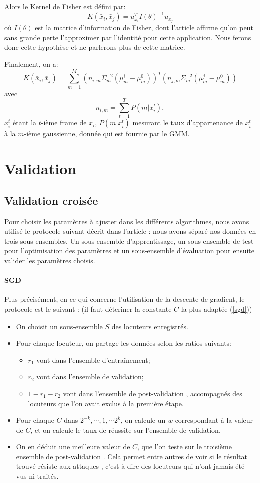 \documentclass{article}
\begin{document}
Alors le Kernel de Fisher est défini par:
\[K(\bar{x}_i,\bar{x}_j) = u_{\bar{x}_i}^{T} I(\theta)^{-1} u_{\bar{x}_j}\]
où $I(\theta)$ est la matrice d'information de Fisher, dont l'article affirme qu'on peut sans grande perte l'approximer par l'identité pour cette application. Nous ferons donc cette hypothèse et ne parlerons plus de cette matrice.


Finalement, on a:
\[ K(\bar{x}_i,\bar{x}_j) = \sum_{m=1}^M (n_{i,m} \Sigma_m^{-2} (\mu_m^i - \mu_m^0))^{T} (n_{j,m} \Sigma_m^{-2} (\mu_m^j - \mu_m^0)) \]
avec
\[n_{i,m} = \sum_{t=1}^{T} P(m | x_i^t),\]
$x_i^t$ étant la $t$-ième frame de $x_i$, $P(m | x_i^t)$ mesurant le taux d'appartenance de $x_i^t$ à la $m$-ième gaussienne, donnée qui est fournie par le GMM.


\section{Validation}
\label{validation}
\subsection{Validation croisée}
Pour choisir les paramètres à ajuster dans les différents algorithmes, nous avons utilisé le protocole suivant décrit dans l'article : nous avons séparé nos données en trois sous-ensembles. Un sous-ensemble d'apprentissage, un sous-ensemble de test pour l'optimisation des paramètres et un sous-ensemble d'évaluation pour ensuite valider les paramètres choisis.

\paragraph{SGD} Plus précisément, en ce qui concerne l'utilisation de la descente de gradient, le protocole est le suivant :
(il faut déteriner la constante $C$ la plus adaptée (\ref{sgd}))
\begin{itemize}
\item On choisit un sous-ensemble $S$ des locuteurs enregistrés.
\item Pour chaque locuteur, on partage les données selon les ratios suivants:
\begin{itemize}
\item $r_1$ vont dans l'ensemble d'entraînement;
\item $r_2$ vont dans l'ensemble de validation;
\item $1 - r_1 - r_2$ vont dans l'ensemble de \og post-validation \fg, accompagnés des locuteurs que l'on avait exclus à la première étape.
\end{itemize}
\item Pour chaque $C$ dans $2^{-k}, \dotsi, 1, \dotsi 2^k$, on calcule un $w$ correspondant à la valeur de $C$, et on calcule le taux de réussite sur l'ensemble de validation.
\item On en déduit une meilleure valeur de $C$, que l'on teste sur le troisième ensemble de \og post-validation \fg. Cela permet entre autres de voir si le résultat trouvé résiste aux \og attaques \fg, c'est-à-dire des locuteurs qui n'ont jamais été vus ni traités.
\end{itemize}
\end{document}
